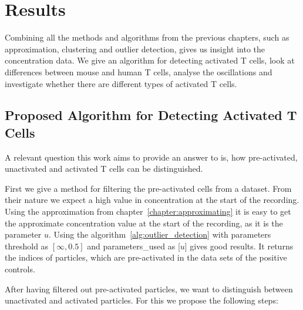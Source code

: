 \chapter{Results}
\label{chapter:results}

Combining all the methods and algorithms from the previous chapters, such as approximation, clustering and outlier detection, gives us insight into the \Calcium concentration data. We give an algorithm for detecting activated T cells, look at differences between mouse and human T cells, analyse the oscillations and investigate whether there are different types of activated T cells.

\section{Proposed Algorithm for Detecting Activated T Cells}
\label{sec:proposed-algorithm}

A relevant question this work aims to provide an answer to is, how pre-activated, unactivated and activated T cells can be distinguished.

First we give a method for filtering the pre-activated cells from a dataset. From their nature we expect a high value in \Calcium concentration at the start of the recording. Using the approximation from chapter~\ref{chapter:approximating} it is easy to get the approximate \Calcium concentration value at the start of the recording, as it is the parameter $u$. Using the algorithm~\ref{alg:outlier_detection} with parameters threshold as $[\infty, 0.5]$ and parameters\_used as [$u$] gives good results. It returns the indices of particles, which are pre-activated in the data sets of the positive controls.

After having filtered out pre-activated particles, we want to distinguish between unactivated and activated particles. For this we propose the following steps:


